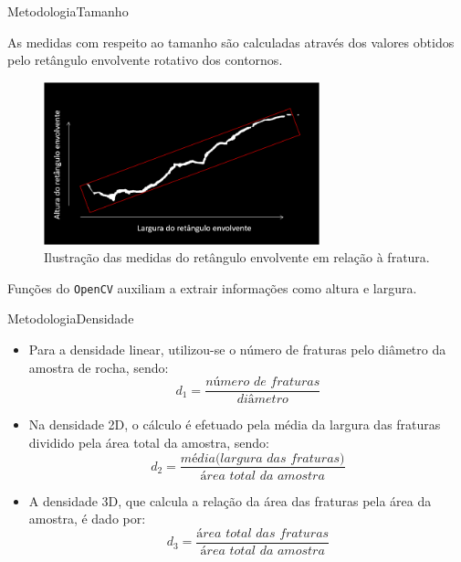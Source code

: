 \documentclass{beamer}
\begin{document}
\begin{frame}{Metodologia}{Tamanho}

As medidas com respeito ao tamanho são calculadas através dos valores obtidos pelo retângulo envolvente rotativo dos contornos.

\begin{figure}[!htb]
\centering
\includegraphics[width=8.0cm]{fig/shape_fracture.PNG}\\
\scriptsize{Ilustração das medidas do retângulo envolvente em relação à fratura.}
\end{figure}

Funções do \texttt{OpenCV} auxiliam a extrair informações como altura e largura.
\end{frame}

\begin{frame}{Metodologia}{Densidade}

\begin{itemize}
    \item Para a densidade linear, utilizou-se o número de fraturas pelo diâmetro da amostra de rocha, sendo:
    \begin{equation}
        d_1 = \frac{\textit{número de fraturas}}{\textit{diâmetro}}
    \end{equation}
    
    
    \item Na densidade 2D, o cálculo é efetuado pela média da largura das fraturas dividido pela área total da amostra, sendo:
    \begin{equation}
        d_2 = \frac{\textit{média(largura das fraturas)}}{\textit{área total da amostra}}
    \end{equation}
    
    \item A densidade 3D, que calcula a relação da área das fraturas pela área da amostra, é dado por:
    \begin{equation}
        d_3 = \frac{\textit{área total das fraturas}}{\textit{área total da amostra}}
    \end{equation}
    
\end{itemize}

\end{frame}
\end{document}
